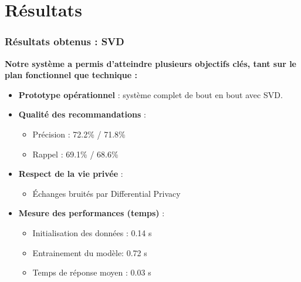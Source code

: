 \documentclass{beamer}
\begin{document}
\section{Résultats}
\begin{frame}
    \frametitle{Résultats obtenus : SVD}
    \scriptsize
    \textbf{Notre système a permis d’atteindre plusieurs objectifs clés, tant sur le plan fonctionnel que technique :}

    \vspace{0.3cm}
    \begin{itemize}
        \item \textbf{Prototype opérationnel} : système complet de bout en bout avec SVD.
        \item \textbf{Qualité des recommandations} :
              \begin{itemize}
                  \item Précision : 72.2\% / 71.8\%
                  \item Rappel : 69.1\% / 68.6\%
              \end{itemize}
        \item \textbf{Respect de la vie privée} :
              \begin{itemize}
                  \item Échanges bruités par Differential Privacy
              \end{itemize}
        \item \textbf{Mesure des performances (temps)} :
              \begin{itemize}
                  \item Initialisation des données : 0.14 s
                  \item Entrainement du modèle: 0.72 s
                  \item Temps de réponse moyen : 0.03 s
              \end{itemize}
    \end{itemize}
\end{frame}
\end{document}
